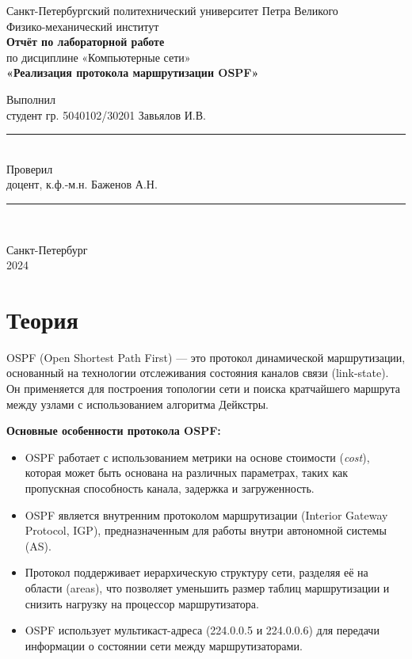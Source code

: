 \documentclass[a4paper,14pt]{extarticle}
\begin{document}
\begin{titlepage}
    \begin{center}
        Санкт-Петербургский политехнический университет Петра Великого\\
        Физико-механический институт\\[4cm]
        
        \textbf{Отчёт по лабораторной работе}\\[0.5cm]
        по дисциплине «Компьютерные сети»\\[0.5cm]
        \textbf{«Реализация протокола маршрутизации OSPF»}\\[4cm]
        
        \begin{flushleft}
            Выполнил\\
            студент гр. 5040102/30201 \hfill Завьялов И.В. \hfill \rule{3cm}{0.1pt} \\[1.5cm]
            Проверил\\
            доцент, к.ф.-м.н. \hfill \hspace{1.5cm} Баженов А.Н. \hfill \rule{3cm}{0.1pt} \\[1.5cm]
        \end{flushleft}
        
        \vfill
        Санкт-Петербург\\
        2024
    \end{center}
\end{titlepage}

\newpage

\tableofcontents

\newpage
\section{Теория}

OSPF (Open Shortest Path First) — это протокол динамической маршрутизации, основанный на технологии отслеживания состояния каналов связи (link-state). Он применяется для построения топологии сети и поиска кратчайшего маршрута между узлами с использованием алгоритма Дейкстры.

\textbf{Основные особенности протокола OSPF:}
\begin{itemize}
    \item OSPF работает с использованием метрики на основе стоимости (\textit{cost}), которая может быть основана на различных параметрах, таких как пропускная способность канала, задержка и загруженность.
    \item OSPF является внутренним протоколом маршрутизации (Interior Gateway Protocol, IGP), предназначенным для работы внутри автономной системы (AS).
    \item Протокол поддерживает иерархическую структуру сети, разделяя её на области (areas), что позволяет уменьшить размер таблиц маршрутизации и снизить нагрузку на процессор маршрутизатора.
    \item OSPF использует мультикаст-адреса (224.0.0.5 и 224.0.0.6) для передачи информации о состоянии сети между маршрутизаторами.
\end{itemize}
\end{document}

